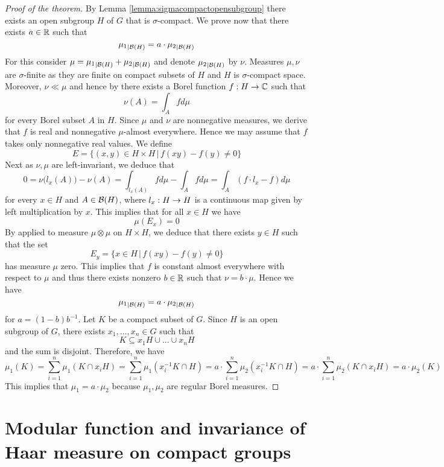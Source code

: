 \begin{proof}[Proof of the theorem]
By Lemma \ref{lemma:sigmacompactopensubgroup} there exists an open subgroup $H$ of $G$ that is $\sigma$-compact. We prove now that there exists $a\in {\mathbb R}$ such that
$${\mu_1}_{\mid {\mathcal B}(H)} = a\cdot {\mu_2}_{\mid {\mathcal B}(H)}$$
For this consider $\mu = {\mu_1}_{\mid {\mathcal B}(H)} + {\mu_2}_{\mid {\mathcal B}(H)}$ and denote ${\mu_2}_{\mid {\mathcal B}(H)}$ by $\nu$. Measures $\mu, \nu$ are $\sigma$-finite as they are finite on compact subsets of $H$ and $H$ is $\sigma$-compact space. Moreover, $\nu \ll \mu$ and hence by {\cite[Theorem 5.3]{RadonNikodymHahnJordanLebesguedecomposition}} there exists a Borel function $f:H\rightarrow {\mathbb C}$ such that
$$\nu(A) = \int_Afd\mu$$
for every Borel subset $A$ in $H$. Since $\mu$ and $\nu$ are nonnegative measures, we derive that $f$ is real and nonnegative $\mu$-almost everywhere. Hence we may assume that $f$ takes only nonnegative real values. We define
$$E = \big\{(x,y)\in H\times H\,\big|\,f(xy) - f(y) \neq 0\big\}$$
Next as $\nu, \mu$ are left-invariant, we deduce that 
$$0 = \nu\big(l_x(A)\big) - \nu(A) = \int_{l_x(A)}fd\mu -\int_{A}fd\mu = \int_{A}\left(f\cdot l_x - f\right)d\mu$$
for every $x\in H$ and $A\in {\mathcal B}(H)$, where $l_x:H\rightarrow H$ is a continuous map given by left multiplication by $x$. This implies that for all $x\in H$ we have
$$\mu(E_x) = 0$$
By {\cite[Theorem 7.5]{Integration}} applied to measure $\mu\otimes \mu$ on $H\times H$, we deduce that there exists $y\in H$ such that the set
$$E_y = \big\{x\in H\,\big|\,f(xy) -f(y) \neq 0\big\}$$
has measure $\mu$ zero. This implies that $f$ is constant almost everywhere with respect to $\mu$ and thus there exists nonzero $b\in {\mathbb R}$ such that $\nu = b\cdot \mu$. Hence we have
$${\mu_1}_{\mid {\mathcal B}(H)} = a\cdot {\mu_2}_{\mid {\mathcal B}(H)}$$
for $a = (1-b)b^{-1}$. Let $K$ be a compact subset of $G$. Since $H$ is an open subgroup of $G$, there exists $x_1,...,x_n\in G$ such that
$$K\subseteq x_1H\cup ...\cup x_nH$$
and the sum is disjoint. Therefore, we have
$$\mu_1(K) = \sum_{i=1}^n\mu_1\left(K\cap x_iH\right) = \sum_{i=1}^n\mu_1\left(x_i^{-1}K\cap H\right) =a\cdot \sum_{i=1}^n\mu_2\left(x_i^{-1}K\cap H\right) = a\cdot \sum_{i=1}^n\mu_2\left(K\cap x_iH\right) = a\cdot \mu_2(K)$$
This implies that $\mu_1 = a\cdot \mu_2$ because $\mu_1,\mu_2$ are regular Borel measures.
\end{proof}

\section{Modular function and invariance of Haar measure on compact groups}






\small




